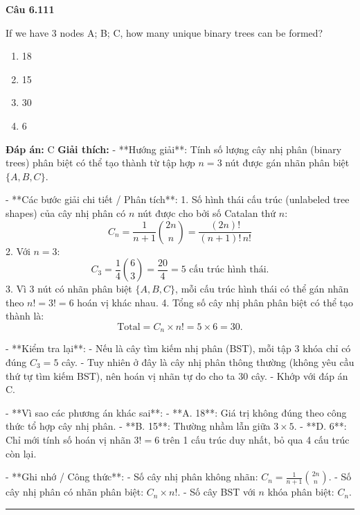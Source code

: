 \documentclass[11pt,a4paper]{article}
\newenvironment{question}[1]{%
  \par\vspace{1em}\noindent\textbf{\large Câu #1}\par\vspace{0.4em}
}{%
  \par\vspace{1em}\hrule\vspace{0.6em}
}
\newenvironment{choices}{%
  \begin{enumerate}[label=\textbf{\Alph*.},leftmargin=2.2em,itemsep=2pt,topsep=3pt]
}{%
  \end{enumerate}
}
\newcommand{\choice}{\item}
\begin{document}
\begin{question}{6.111}
If we have 3 nodes {A; B; C}, how many unique binary trees can be formed?
\begin{choices}
\choice 18
\choice 15
\choice 30
\choice 6
\end{choices}
\textbf{Đáp án:} C
\textbf{Giải thích:} - **Hướng giải**:
  Tính số lượng cây nhị phân (binary trees) phân biệt có thể tạo thành từ tập hợp \(n = 3\) nút được gán nhãn phân biệt \(\{A, B, C\}\).

- **Các bước giải chi tiết / Phân tích**:
  1. Số hình thái cấu trúc (unlabeled tree shapes) của cây nhị phân có \(n\) nút được cho bởi số Catalan thứ \(n\):
     \[ C_n = \frac{1}{n+1}\binom{2n}{n} = \frac{(2n)!}{(n+1)!\,n!} \]
  2. Với \(n = 3\):
     \[ C_3 = \frac{1}{4}\binom{6}{3} = \frac{20}{4} = 5 \text{ cấu trúc hình thái.} \]
  3. Vì 3 nút có nhãn phân biệt \(\{A, B, C\}\), mỗi cấu trúc hình thái có thể gán nhãn theo \(n! = 3! = 6\) hoán vị khác nhau.
  4. Tổng số cây nhị phân phân biệt có thể tạo thành là:
     \[ \text{Total} = C_n \times n! = 5 \times 6 = 30. \]

- **Kiểm tra lại**:
  - Nếu là cây tìm kiếm nhị phân (BST), mỗi tập 3 khóa chỉ có đúng \(C_3 = 5\) cây.
  - Tuy nhiên ở đây là cây nhị phân thông thường (không yêu cầu thứ tự tìm kiếm BST), nên hoán vị nhãn tự do cho ta \(30\) cây.
  - Khớp với đáp án C.

- **Vì sao các phương án khác sai**:
  - **A. 18**: Giá trị không đúng theo công thức tổ hợp cây nhị phân.
  - **B. 15**: Thường nhầm lẫn giữa \(3 \times 5\).
  - **D. 6**: Chỉ mới tính số hoán vị nhãn \(3! = 6\) trên 1 cấu trúc duy nhất, bỏ qua 4 cấu trúc còn lại.

- **Ghi nhớ / Công thức**:
  - Số cây nhị phân không nhãn: \(C_n = \frac{1}{n+1}\binom{2n}{n}\).
  - Số cây nhị phân có nhãn phân biệt: \(C_n \times n!\).
  - Số cây BST với \(n\) khóa phân biệt: \(C_n\).
\end{question}
\end{document}
